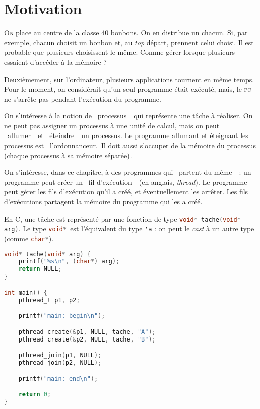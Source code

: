 \section{Motivation}

\lettrine On place au centre de la classe 40 bonbons. On en distribue un chacun. Si, par exemple, chacun choisit un bonbon et, au \textit{top} départ, prennent celui choisi.
Il est probable que plusieurs choisissent le même. Comme gérer lorsque plusieurs essaient d'accéder à la mémoire ?

Deuxièmement, sur l'ordinateur, plusieurs applications tournent en même temps. Pour le moment, on considérait qu'un seul programme était exécuté, mais, le \textsc{pc} ne s'arrête pas pendant l'exécution du programme.

On s'intéresse à la notion de \guillemotleft~processus~\guillemotright\ qui représente une tâche à réaliser.
On ne peut pas assigner un processus à une unité de calcul, mais on peut \guillemotleft~allumer~\guillemotright\ et \guillemotleft~éteindre~\guillemotright\ un processus.
Le programme allumant et éteignant les processus est \guillemotleft~l'ordonnanceur.~\guillemotright\@ Il doit aussi s'occuper de la mémoire du processus (chaque processus à sa mémoire séparée).

On s'intéresse, dans ce chapitre, à des programmes qui \guillemotleft~partent du même~\guillemotright\ : un programme peut créer un \guillemotleft~fil d'exécution~\guillemotright\ (en anglais, \textit{thread}). Le programme peut gérer les fils d'exécution qu'il a créé, et éventuellement les arrêter.
Les fils d'exécutions partagent la mémoire du programme qui les a créé.

En C, une tâche est représenté par une fonction de type \lstinline[language=c]!void* tache(void* arg)!. Le type \lstinline[language=c]!void*!\ est l'équivalent du type \lstinline[language=caml]!'a! : on peut le \textit{cast} à un autre type (comme \lstinline[language=c]-char*-).

\begin{lstlisting}[language=c,caption=Création de \textit{thread}s en C]
void* tache(void* arg) {
	printf("%s\n", (char*) arg);
	return NULL;
}

int main() {
	pthread_t p1, p2;

	printf("main: begin\n");

	pthread_create(&p1, NULL, tache, "A");
	pthread_create(&p2, NULL, tache, "B");

	pthread_join(p1, NULL);
	pthread_join(p2, NULL);

	printf("main: end\n");

	return 0;
}
\end{lstlisting}

